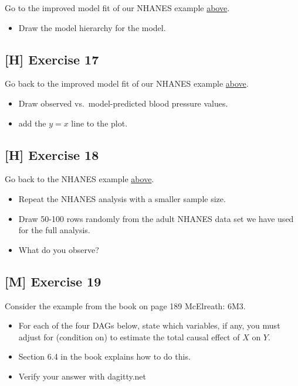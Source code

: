\documentclass[
]{book}
\providecommand{\tightlist}{%
  \setlength{\itemsep}{0pt}\setlength{\parskip}{0pt}}
\begin{document}
Go to the improved model fit of our NHANES example \hyperref[improve_model_NHANES]{above}.

\begin{itemize}
\tightlist
\item
  Draw the model hierarchy for the model.
\end{itemize}

\subsection{{[}H{]} Exercise 17}\label{exercise17_multiple_regression}

Go back to the improved model fit of our NHANES example \hyperref[improve_model_NHANES]{above}.

\begin{itemize}
\tightlist
\item
  Draw observed vs.~model-predicted blood pressure values.
\item
  add the \(y=x\) line to the plot.
\end{itemize}

\subsection{{[}H{]} Exercise 18}\label{exercise18_multiple_regression}

Go back to the NHANES example \hyperref[example_nhanes]{above}.

\begin{itemize}
\tightlist
\item
  Repeat the NHANES analysis with a smaller sample size.
\item
  Draw 50-100 rows randomly from the adult NHANES data set we have used for the full
  analysis.
\item
  What do you observe?
\end{itemize}

\subsection{{[}M{]} Exercise 19}\label{exercise19_multiple_regression}

Consider the example from the book on page 189 McElreath: 6M3.

\begin{itemize}
\tightlist
\item
  For each of the four DAGs below, state which variables, if any, you must
  adjust for (condition on) to estimate the total causal effect of \(X\) on \(Y\).
\item
  Section 6.4 in the book explains how to do this.
\item
  Verify your answer with dagitty.net
\end{itemize}
\end{document}
